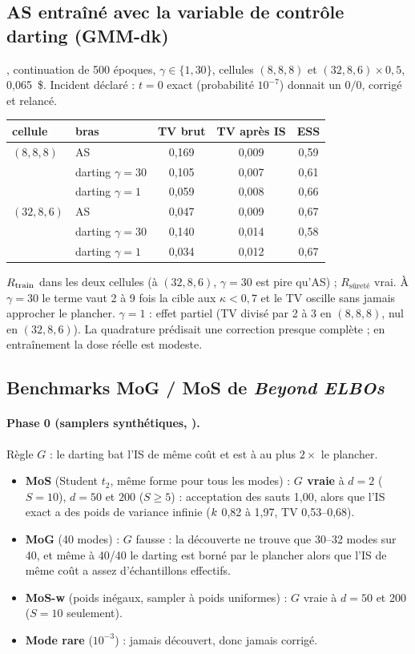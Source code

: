 \subsection{AS entraîné avec la variable de contrôle darting (GMM-dk)}
, continuation de 500 époques, $\gamma\in\{1,30\}$, cellules $(8,8,8)$ et $(32,8,6)\times0{,}5$, 0,065~\$. Incident déclaré : $t=0$ exact (probabilité $10^{-7}$) donnait un $0/0$, corrigé et relancé.
\begin{table}[h]\centering\small
\begin{tabular}{llccc}\toprule
cellule & bras & TV brut & TV après IS & ESS\\\midrule
$(8,8,8)$ & AS & 0,169 & 0,009 & 0,59\\
 & darting $\gamma=30$ & 0,105 & 0,007 & 0,61\\
 & darting $\gamma=1$ & 0,059 & 0,008 & 0,66\\
$(32,8,6)$ & AS & 0,047 & 0,009 & 0,67\\
 & darting $\gamma=30$ & 0,140 & 0,014 & 0,58\\
 & darting $\gamma=1$ & 0,034 & 0,012 & 0,67\\\bottomrule
\end{tabular}
\end{table}
\begin{verdict}$R_{\rm train}$ \faux{} dans les deux cellules (à $(32,8,6)$, $\gamma=30$ est pire qu'AS) ; $R_{\text{sûreté}}$ vrai. À $\gamma=30$ le terme vaut 2 à 9 fois la cible aux $\kappa<0{,}7$ et le TV oscille sans jamais approcher le plancher. $\gamma=1$ : effet partiel (TV divisé par 2 à 3 en $(8,8,8)$, nul en $(32,8,6)$). La quadrature prédisait une correction presque complète ; en entraînement la dose réelle est modeste.\end{verdict}

\subsection{Benchmarks MoG / MoS de \emph{Beyond ELBOs}}
\paragraph{Phase 0 (samplers synthétiques, ).} Règle $G$ : le darting bat l'IS de même coût et est à au plus $2\times$ le plancher.
\begin{itemize}
  \item \textbf{MoS} (Student $t_2$, même forme pour tous les modes) : \textbf{$G$ vraie} à $d=2$ ($S=10$), $d=50$ et $200$ ($S\ge5$) : acceptation des sauts 1,00, alors que l'IS exact a des poids de variance infinie ($k$ 0,82 à 1,97, TV 0,53--0,68).
  \item \textbf{MoG} (40 modes) : $G$ fausse : la découverte ne trouve que 30--32 modes sur 40, et même à 40/40 le darting est borné par le plancher alors que l'IS de même coût a assez d'échantillons effectifs.
  \item \textbf{MoS-w} (poids inégaux, sampler à poids uniformes) : $G$ vraie à $d=50$ et 200 ($S=10$ seulement).
  \item \textbf{Mode rare} ($10^{-3}$) : jamais découvert, donc jamais corrigé.
\end{itemize}
